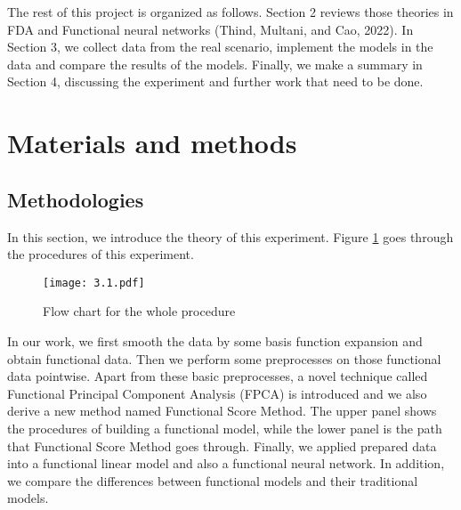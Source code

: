 The rest of this project is organized as follows. Section 2 reviews those theories in FDA and Functional neural networks (Thind, Multani, and Cao, 2022). In Section 3, we collect data from the real scenario, implement the models in the data and compare the results of the models. Finally, we make a summary in Section 4, discussing the experiment and further work that need to be done.


\section{Materials and methods}

\subsection{Methodologies}
In this section, we introduce the theory of this experiment. Figure \ref{fig: flowchart} goes through the procedures of this experiment.\\
\begin{figure}[H] %
\centering %
\texttt{[image: 3.1.pdf]} %
\caption{Flow chart for the whole procedure} %
\label{fig: flowchart} %
\end{figure}
\noindent
In our work, we first smooth the data by some basis function expansion and obtain functional data. Then we perform some preprocesses on those functional data pointwise. Apart from these basic preprocesses, a novel technique called Functional Principal Component Analysis (FPCA) is introduced and we also derive a new method named Functional Score Method. The upper panel shows the procedures of building a functional model, while the lower panel is the path that Functional Score Method goes through. Finally, we applied prepared data into a functional linear model and also a functional neural network. In addition, we compare the differences between functional models and their traditional models. 
 
